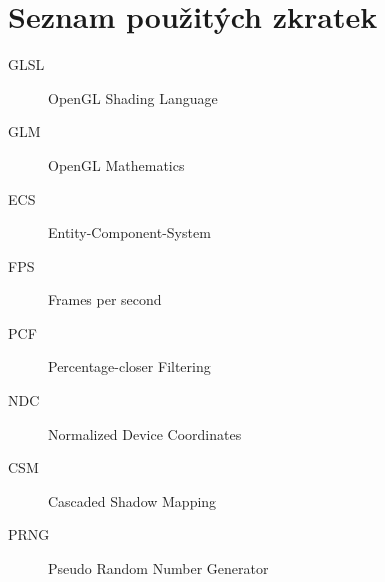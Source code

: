 \documentclass[thesis=M,czech]{FITthesis}[2019/12/23]
\begin{document}



\appendix

\chapter{Seznam použitých zkratek}
\begin{description}
	\item[GLSL] OpenGL Shading Language
	\item[GLM] OpenGL Mathematics
	\item[ECS] Entity-Component-System
	\item[FPS] Frames per second
	\item[PCF] Percentage-closer Filtering
	\item[NDC] Normalized Device Coordinates
	\item[CSM] Cascaded Shadow Mapping
	\item[PRNG] Pseudo Random Number Generator
\end{description}
\end{document}
